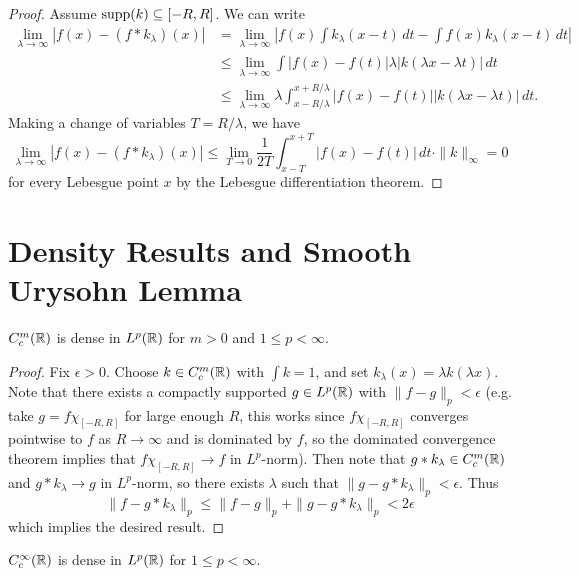 \begin{proof}
  Assume $\operatorname{supp}(k) \subseteq [-R, R]$.
  We can write
  \begin{align*}
    \lim_{\lambda \to \infty}
    |f(x) - (f * k_{\lambda})(x)|
    &= \lim_{\lambda \to \infty}
    \left|f(x) \int k_\lambda(x - t)\, dt - \int f(x) k_{\lambda}(x - t)\, dt\right| \\
    &\le \lim_{\lambda \to \infty}
    \int |f(x) - f(t)| \lambda |k(\lambda x - \lambda t)|\, dt \\
    &\le \lim_{\lambda \to \infty}
    \lambda \int_{x - R / \lambda}^{x + R / \lambda} |f(x) - f(t)| |k(\lambda x - \lambda t)|\, dt.
  \end{align*}
  Making a change of variables
  $T = R / \lambda$, we have
  \[
    \lim_{\lambda \to \infty}
    |f(x) - (f * k_{\lambda})(x)|
    \le \lim_{T \to 0}
     \frac{1}{2T}\int_{x - T}^{x + T} |f(x) - f(t)| \, dt
     \cdot \|k\|_{\infty}
     = 0
  \]
  for every Lebesgue point $x$
  by the Lebesgue differentiation theorem.
\end{proof}

\section{Density Results and Smooth Urysohn Lemma}
\begin{theorem}
  $C_c^m(\mathbb{R})$ is dense in $L^p(\mathbb{R})$
  for $m > 0$ and $1 \le p < \infty$.
\end{theorem}

\begin{proof}
  Fix $\epsilon > 0$. Choose
  $k \in C_c^m(\mathbb{R})$ with
  $\int k = 1$, and
  set $k_{\lambda}(x) = \lambda k(\lambda x)$.
  Note that there exists a compactly
  supported $g \in L^p(\mathbb{R})$ with
  $\|f - g\|_p < \epsilon$ (e.g.
  take $g = f \chi_{[-R, R]}$ for large
  enough $R$, this works since $f \chi_{[-R, R]}$ converges
  pointwise to $f$ as $R \to \infty$ and
  is dominated by $f$, so the dominated
  convergence theorem implies that
  $f \chi_{[-R, R]} \to f$ in $L^p$-norm).
  Then note that
  $g * k_{\lambda} \in C_c^m(\mathbb{R})$ and
  $g * k_{\lambda} \to g$ in $L^p$-norm, so
  there exists $\lambda$ such that
  $\|g - g * k_{\lambda}\|_p < \epsilon$.
  Thus
  \[
    \|f - g * k_{\lambda}\|_p
    \le \|f - g\|_p + \|g - g * k_{\lambda}\|_p
    < 2\epsilon
  \]
  which implies the desired result.
\end{proof}

\begin{corollary}
  $C_c^{\infty}(\mathbb{R})$ is dense in $L^p(\mathbb{R})$
  for $1 \le p < \infty$.
\end{corollary}

